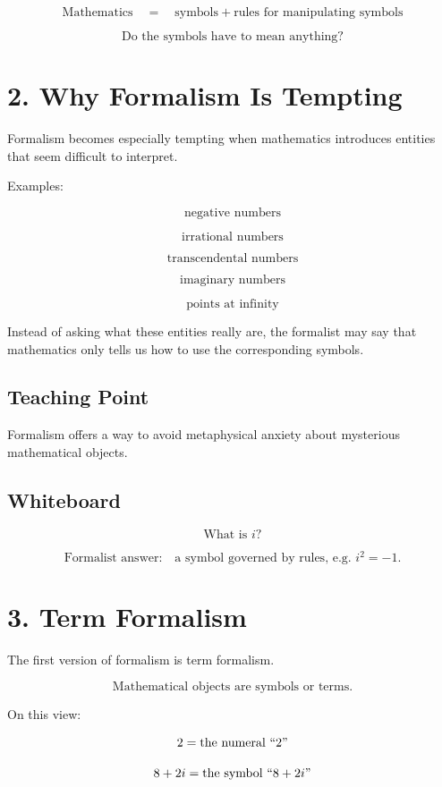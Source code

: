 \documentclass[11pt]{article}
\begin{document}
\[
\text{Mathematics}
\quad =
\quad
\text{symbols}
+
\text{rules for manipulating symbols}
\]

\[
\text{Do the symbols have to mean anything?}
\]

\section*{2. Why Formalism Is Tempting}

Formalism becomes especially tempting when mathematics introduces entities that seem
difficult to interpret.

Examples:

\[
\text{negative numbers}
\]

\[
\text{irrational numbers}
\]

\[
\text{transcendental numbers}
\]

\[
\text{imaginary numbers}
\]

\[
\text{points at infinity}
\]

Instead of asking what these entities really are, the formalist may say that mathematics
only tells us how to use the corresponding symbols.

\subsection*{Teaching Point}

Formalism offers a way to avoid metaphysical anxiety about mysterious mathematical
objects.

\subsection*{Whiteboard}

\[
\text{What is } i?
\]

\[
\text{Formalist answer:}
\quad
\text{a symbol governed by rules, e.g. } i^2=-1.
\]

\section*{3. Term Formalism}

The first version of formalism is term formalism.

\[
\boxed{
\text{Mathematical objects are symbols or terms.}
}
\]

On this view:

\[
2 = \text{the numeral } ``2"
\]

\[
8+2i = \text{the symbol } ``8+2i"
\]
\end{document}
